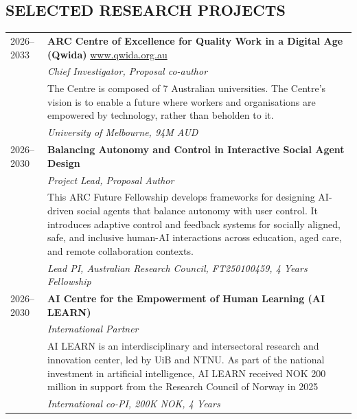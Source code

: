 
\subsection{SELECTED RESEARCH PROJECTS}
\vspace{2pt}

\noindent
\begin{longtable}{@{}lp{\dimexpr\textwidth-2.8cm\relax}@{}}
2026--2033 & \textbf{ARC Centre of Excellence for Quality Work in a Digital Age (Qwida)}  \href{https://www.qwida.org.au}{www.qwida.org.au} \\
           & \emph{Chief Investigator, Proposal co-author} \\
           & The Centre is composed of 7 Australian universities. The Centre's vision is to enable a future where workers and organisations are empowered by technology, rather than beholden to it. \\
           & \textit{University of Melbourne, 94M AUD} \\[3pt]

2026--2030 & \textbf{Balancing Autonomy and Control in Interactive Social Agent Design} \\
           & \emph{Project Lead, Proposal Author} \\
           & This ARC Future Fellowship develops frameworks for designing AI-driven social agents that balance autonomy with user control. It introduces adaptive control and feedback systems for socially aligned, safe, and inclusive human-AI interactions across education, aged care, and remote collaboration contexts. \\
           & \textit{Lead PI, Australian Research Council, FT250100459, 4 Years Fellowship} \\[3pt]

2026--2030 & \textbf{AI Centre for the Empowerment of Human Learning (AI LEARN)} \\
           & \emph{International Partner} \\
           &  AI LEARN  is an interdisciplinary and intersectoral research and innovation center, led by UiB and NTNU. As part of the national investment in artificial intelligence, AI LEARN received NOK 200 million in support from the Research Council of Norway in 2025\\
           & \textit{International co-PI, 200K NOK, 4 Years} \\[3pt]


\end{longtable}

